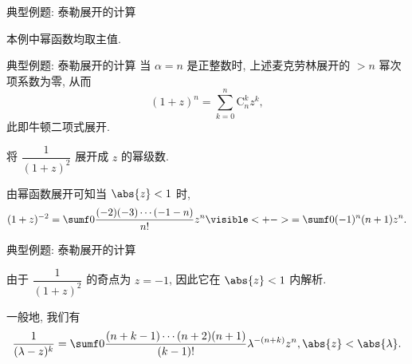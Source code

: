 \begin{frame}{典型例题: 泰勒展开的计算}
	\onslide<+->
	\begin{example}
		本例中幂函数均取主值.
		\bigdel
	\end{example}
\end{frame}

\begin{frame}{典型例题: 泰勒展开的计算}
	\onslide<+->
	当 $\alpha=n$ 是正整数时, 上述麦克劳林展开的 $>n$ 幂次项系数为零, 
	\onslide<+->
	从而
	\[
		(1+z)^n=\sum_{k=0}^n \mathrm{C}_n^k z^k,
	\]
	此即牛顿二项式展开.

	\onslide<+->
	\begin{example}[nearnext]
		将 $\dfrac1{(1+z)^2}$ 展开成 $z$ 的幂级数.
	\end{example}

	\onslide<+->
	\begin{solution}[nearprev]
		由幂函数展开可知当 $\abs{z}<1$ 时,
		\[
			(1+z)^{-2}=\sumf0 \frac{(-2)(-3)\cdots(-1-n)}{n!}z^n
			\visible<+->{=\sumf0 (-1)^n(n+1)z^n.}
		\]
		\bigdel
	\end{solution}
\end{frame}


\begin{frame}{典型例题: 泰勒展开的计算}
	\onslide<+->
	\begin{solution}[nearprev][另解]
		由于 $\dfrac1{(1+z)^2}$ 的奇点为 $z=-1$, 因此它在 $\abs{z}<1$ 内解析.
		\bigdel
	\end{solution}
	\onslide<+->
	一般地, 我们有
	\[
		\frac1{(\lambda-z)^k}
		=\sumf0 \frac{(n+k-1)\cdots(n+2)(n+1)}{(k-1)!}\lambda^{-(n+k)}z^n,\abs{z}<\abs{\lambda}.
	\]
\end{frame}


